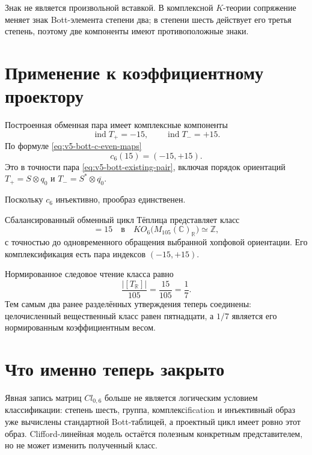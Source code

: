 Знак не является произвольной вставкой. В комплексной $K$-теории
сопряжение меняет знак Bott-элемента степени два; в степени шесть действует
его третья степень, поэтому две компоненты имеют противоположные знаки.

\section{Применение к коэффициентному проектору}

Построенная обменная пара имеет комплексные компоненты
\begin{equation}
 \operatorname{ind}T_+=-15,
 \qquad
 \operatorname{ind}T_-=+15.
 \label{eq:v5-bott-existing-pair}
\end{equation}
По формуле \eqref{eq:v5-bott-c-even-maps}
\begin{equation}
 c_6(15)=(-15,+15).
 \label{eq:v5-bott-fifteen-image}
\end{equation}
Это в точности пара \eqref{eq:v5-bott-existing-pair}, включая порядок
ориентаций $T_+=S\otimes q_0$ и
$T_-=S^*\otimes\overline{q_0}$.

Поскольку $c_6$ инъективно, прообраз единственен.

\begin{theorem}
Сбалансированный обменный цикл Тёплица представляет класс
\begin{equation}
 [T_{\mathbb R}]=15
 \quad\text{в}\quad
 KO_6\bigl(M_{105}(\mathbb C)_{\mathbb R}\bigr)
 \simeq\mathbb Z,
 \label{eq:v5-bott-real-class-fifteen}
\end{equation}
с точностью до одновременного обращения выбранной хопфовой ориентации.
Его комплексификация есть пара индексов $(-15,+15)$.
\end{theorem}

Нормированное следовое чтение класса равно
\begin{equation}
 \frac{|[T_{\mathbb R}]|}{105}
 =\frac{15}{105}
 =\frac17.
 \label{eq:v5-bott-real-one-seventh}
\end{equation}
Тем самым два ранее разделённых утверждения теперь соединены:
целочисленный вещественный класс равен пятнадцати, а $1/7$ является его
нормированным коэффициентным весом.

\section{Что именно теперь закрыто}

Явная запись матриц $Cl_{0,6}$ больше не является логическим условием
классификации: степень шесть, группа, комплексification и инъективный образ
уже вычислены стандартной Bott-таблицей, а проектный цикл имеет ровно этот
образ. Clifford-линейная модель остаётся полезным конкретным
представителем, но не может изменить полученный класс.

